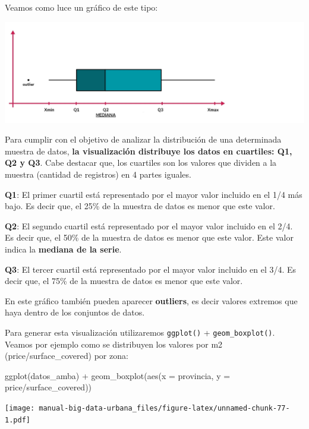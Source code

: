 \documentclass[
  spanish,
]{book}
\newenvironment{Shaded}{\begin{snugshade}}{\end{snugshade}}
\newcommand{\AttributeTok}[1]{\textcolor[rgb]{0.77,0.63,0.00}{#1}}
\newcommand{\FunctionTok}[1]{\textcolor[rgb]{0.00,0.00,0.00}{#1}}
\newcommand{\NormalTok}[1]{#1}
\newcommand{\SpecialCharTok}[1]{\textcolor[rgb]{0.00,0.00,0.00}{#1}}
\begin{document}
Veamos como luce un gráfico de este tipo:

\includegraphics{images/geom_boxplot.jpg}

Para cumplir con el objetivo de analizar la distribución de una determinada muestra de datos, \textbf{la visualización distribuye los datos en cuartiles: Q1, Q2 y Q3}. Cabe destacar que, los cuartiles son los valores que dividen a la muestra (cantidad de registros) en 4 partes iguales.

\textbf{Q1}: El primer cuartil está representado por el mayor valor incluido en el 1/4 más bajo. Es decir que, el 25\% de la muestra de datos es menor que este valor.

\textbf{Q2}: El segundo cuartil está representado por el mayor valor incluido en el 2/4. Es decir que, el 50\% de la muestra de datos es menor que este valor. Este valor indica la \textbf{mediana de la serie}.

\textbf{Q3}: El tercer cuartil está representado por el mayor valor incluido en el 3/4. Es decir que, el 75\% de la muestra de datos es menor que este valor.

En este gráfico también pueden aparecer \textbf{outliers}, es decir valores extremos que haya dentro de los conjuntos de datos.

Para generar esta visualización utilizaremos \texttt{ggplot()} + \texttt{geom\_boxplot()}. Veamos por ejemplo como se distribuyen los valores por m2 (price/surface\_covered) por zona:

\begin{Shaded}
\begin{Highlighting}[]
\FunctionTok{ggplot}\NormalTok{(datos\_amba) }\SpecialCharTok{+}
  \FunctionTok{geom\_boxplot}\NormalTok{(}\FunctionTok{aes}\NormalTok{(}\AttributeTok{x =}\NormalTok{ provincia, }\AttributeTok{y =}\NormalTok{ price}\SpecialCharTok{/}\NormalTok{surface\_covered))}
\end{Highlighting}
\end{Shaded}

\texttt{[image: manual-big-data-urbana\_files/figure-latex/unnamed-chunk-77-1.pdf]}
\end{document}
